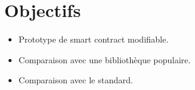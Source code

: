 \section{Objectifs}

\begin{itemize}
    \item Prototype de smart contract modifiable.
    \item Comparaison avec une bibliothèque populaire.
    \item Comparaison avec le standard.
\end{itemize}

